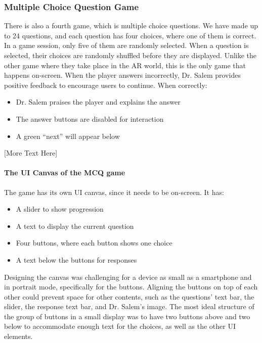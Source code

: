\subsubsection*{Multiple Choice Question Game}
There is also a fourth game, which is multiple choice questions. We have made up to 24 questions, and each question has four choices, where one of them is correct. In a game session, only five of them are randomly selected. When a question is selected, their choices are randomly shuffled before they are displayed. Unlike the other game where they take place in the AR world, this is the only game that happens on-screen. When the player answers incorrectly, Dr. Salem provides positive feedback to encourage users to continue. When correctly:
\begin{itemize}
\item{Dr. Salem praises the player and explains the answer}
\item{The answer buttons are disabled for interaction}
\item{A green “next” will appear below}
\end{itemize}

[More Text Here]
\paragraph*{The UI Canvas of the MCQ game}
The game has its own UI canvas, since it needs to be on-screen. It has:
\begin{itemize}
\item{A slider to show progression}
\item{A text to display the current question}
\item{Four buttons, where each button shows one choice}
\item{A text below the buttons for responses}
\end{itemize}
Designing the canvas was challenging for a device as small as a smartphone and in portrait mode, specifically for the buttons. Aligning the buttons on top of each other could prevent space for other contents, such as the questions’ text bar, the slider, the response text bar, and Dr. Salem’s image. The most ideal structure of the group of buttons in a small display was to have two buttons above and two below to accommodate enough text for the choices, as well as the other UI elements.

